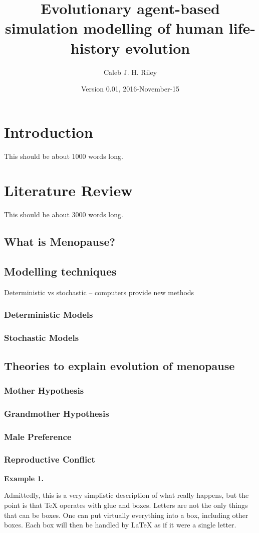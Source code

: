 \documentclass[authoryearcitations]{UoYCSproject}
\author{Caleb J. H. Riley}
\title{Evolutionary agent-based simulation modelling of human life-history evolution}
\date{Version 0.01, 2016-November-15}
\begin{document}
\maketitle
\listoffigures
\listoftables

\cleardoublepage

\chapter{Introduction}
\label{cha:Introduction}
This should be about 1000 words long.

\chapter{Literature Review}
\label{cha:Literature Review}
This should be about 3000 words long.

\section{What is Menopause?}

\section{Modelling techniques}
Deterministic vs stochastic -- computers provide new methods
\subsection{Deterministic Models}
\subsection{Stochastic Models}

\section{Theories to explain evolution of menopause}
\subsection{Mother Hypothesis}
\subsection{Grandmother Hypothesis}
\subsection{Male Preference}
\subsection{Reproductive Conflict}
\begin{framed}
\noindent \textbf{Example 1.}

Admittedly, this is a very simplistic description of what really happens, but the point is that TeX operates with glue and boxes. Letters are not the only things that can be boxes. \cite{whymenmatter2007} One can put virtually everything into a box, including other boxes. Each box will then be handled by LaTeX as if it were a single letter.
\end{framed}
\end{document}
